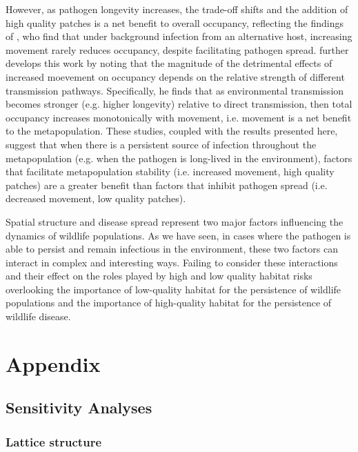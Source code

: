 \documentclass{svjour3}
\begin{document}
However, as pathogen longevity increases, the trade-off shifts and the addition of high quality patches is a net benefit to overall occupancy, reflecting the findings of \cite{Gog2002}, who find that under background infection from an alternative host, increasing movement rarely reduces occupancy, despite facilitating pathogen spread.  \cite{Park2012} further develops this work by noting that the magnitude of the detrimental effects of increased moevement on occupancy depends on the relative strength of different transmission pathways.  Specifically, he finds that as environmental transmission becomes stronger (e.g. higher longevity) relative to direct transmission, then total occupancy increases monotonically with movement, i.e. movement is a net benefit to the metapopulation.  These studies, coupled with the results presented here, suggest that when there is a persistent source of infection throughout the metapopulation (e.g. when the pathogen is long-lived in the environment), factors that facilitate metapopulation stability (i.e. increased movement, high quality patches) are a greater benefit than factors that inhibit pathogen spread (i.e. decreased movement, low quality patches).  

Spatial structure and disease spread represent two major factors influencing the dynamics of wildlife populations.  As we have seen, in cases where the pathogen is able to persist and remain infectious in the environment, these two factors can interact in complex and interesting ways.  Failing to consider these interactions and their effect on the roles played by high and low quality habitat risks overlooking the importance of low-quality habitat for the persistence of wildlife populations and the importance of high-quality habitat for the persistence of wildlife disease.

\clearpage

\section{Appendix}

\subsection{Sensitivity Analyses}

\subsubsection{Lattice structure}
\end{document}
